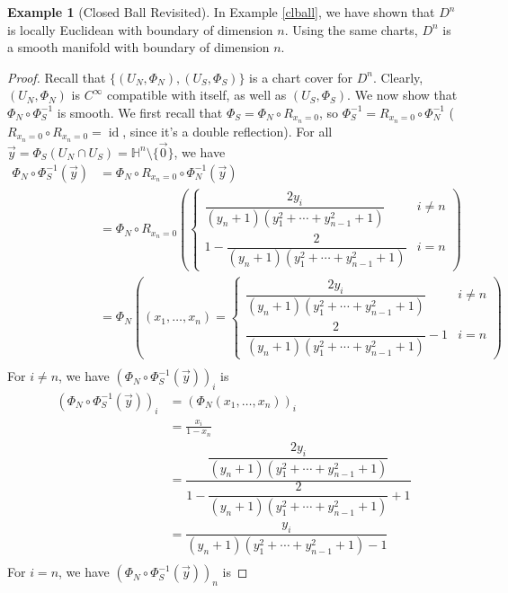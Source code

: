 \documentclass{article}
\renewcommand{\H}{\mathbb{H}}
\newcommand{\id}{\operatorname{id}}
\theoremstyle{plain} %
\numberwithin{thm}{section} %
\theoremstyle{definition} %
\newtheorem{example}[thm]{Example}
\begin{document}
\begin{example}[Closed Ball Revisited]
    In Example \ref{clball}, we have shown that $D^n$ is locally Euclidean with boundary of dimension $n$. Using the same charts, $D^n$ is a smooth manifold with boundary of dimension $n$.
\end{example}

\begin{proof}
Recall that $\{(U_N, \Phi_N), (U_S, \Phi_S)\}$ is a chart cover for $D^n$. Clearly, $(U_N, \Phi_N)$ is $C^\infty$ compatible with itself, as well as $(U_S, \Phi_S)$. We now show that $\Phi_N \circ \Phi_S^{-1}$ is smooth. We first recall that $\Phi_S = \Phi_N \circ R_{x_n = 0}$, so $\Phi_S^{-1} = R_{x_n = 0} \circ \Phi_N^{-1}$ ($R_{x_n = 0} \circ R_{x_n = 0} = \id$, since it's a double reflection). For all $\vec{y} = \Phi_S(U_N \cap U_S) = \H^n \setminus \{\vec{0}\}$, we have
\begin{align*}
    \Phi_N \circ \Phi_S^{-1}(\vec{y})
    &= \Phi_N \circ R_{x_n = 0} \circ \Phi_N^{-1}(\vec{y}) \\
    &= \Phi_N \circ R_{x_n = 0} \left(\begin{cases}
        \dfrac{2y_i}{(y_n + 1)(y_1^2 + \cdots + y_{n - 1}^2 + 1)} & i \neq n \\
        1 - \dfrac{2}{(y_n + 1)(y_1^2 + \cdots + y_{n - 1}^2 + 1)} & i = n
    \end{cases}\right) \\
    &= \Phi_N \left((x_1, \dots, x_n) = \begin{cases}
        \dfrac{2y_i}{(y_n + 1)(y_1^2 + \cdots + y_{n - 1}^2 + 1)} & i \neq n \\
        \dfrac{2}{(y_n + 1)(y_1^2 + \cdots + y_{n - 1}^2 + 1)} - 1 & i = n
    \end{cases}\right) \\
\end{align*}
For $i \neq n$, we have $(\Phi_N \circ \Phi_S^{-1}(\vec{y}))_i$ is 
\begin{align*}
    (\Phi_N \circ \Phi_S^{-1}(\vec{y}))_i 
    &= (\Phi_N(x_1, \dots, x_n))_i \\
    &= \frac{x_i}{1 - x_n} \\
    &= \dfrac{\dfrac{2y_i}{(y_n + 1)(y_1^2 + \cdots + y_{n - 1}^2 + 1)}}{1 - \dfrac{2}{(y_n + 1)(y_1^2 + \cdots + y_{n - 1}^2 + 1)} + 1} \\
    &= \dfrac{y_i}{(y_n + 1)(y_1^2 + \cdots + y_{n - 1}^2 + 1) - 1} \\
\end{align*}
For $i = n$, we have $(\Phi_N \circ \Phi_S^{-1}(\vec{y}))_n$ is 

\end{proof}
\end{document}
